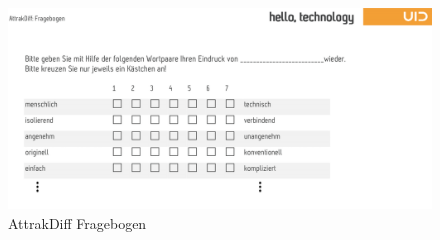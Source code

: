 \begin{description}
%



\begin{figure}[H]
    \centering
    \includegraphics[width=1\textwidth]{files/usa/attrakDiff}
    \caption{AttrakDiff Fragebogen \cite{Anonymous:7qH50iIl}}
    \label{pic:attrakDiff}
\end{figure}





\end{description}
